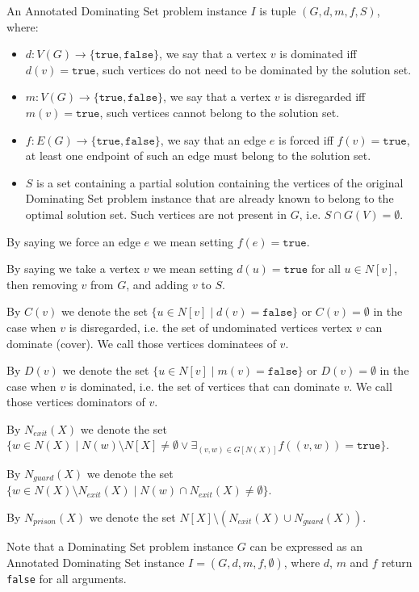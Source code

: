 \documentclass[a4paper,UKenglish,cleveref, autoref, thm-restate]{lipics-v2021}
\begin{document}
An Annotated Dominating Set problem instance $I$ is tuple $(G, d, m, f, S)$, where:
\begin{itemize}
    \item $d: V(G) \to \{\texttt{true}, \texttt{false}\}$, we say that a vertex $v$ is dominated iff $d(v) = \texttt{true}$, such vertices do not need to be dominated by the solution set.
    \item $m: V(G) \to \{\texttt{true}, \texttt{false}\}$, we say that a vertex $v$ is disregarded iff $m(v) = \texttt{true}$, such vertices cannot belong to the solution set.
    \item $f: E(G) \to \{\texttt{true}, \texttt{false}\}$, we say that an edge $e$ is forced iff $f(v) = \texttt{true}$, at least one endpoint of such an edge must belong to the solution set.
    \item $S$ is a set containing a partial solution containing the vertices of the original Dominating Set problem instance that are already known to belong to the optimal solution set.
    Such vertices are not present in $G$, i.e. $S \cap G(V) = \emptyset$.
\end{itemize}

By saying we force an edge $e$ we mean setting $f(e) = \texttt{true}$.

By saying we take a vertex $v$ we mean setting $d(u) = \texttt{true}$ for all $u \in N[v]$, then removing $v$ from $G$, and adding $v$ to $S$.

By $C(v)$ we denote the set $\{u \in N[v] \mid d(v) = \texttt{false}\}$ or $C(v) = \emptyset$ in the case when $v$ is disregarded, i.e. the set of undominated vertices vertex $v$ can dominate (cover). We call those vertices dominatees of $v$.

By $D(v)$ we denote the set $\{u \in N[v] \mid m(v) = \texttt{false}\}$ or $D(v) = \emptyset$ in the case when $v$ is dominated, i.e. the set of vertices that can dominate $v$. We call those vertices dominators of $v$.

By $N_{exit}(X)$ we denote the set $\{w \in N(X) \mid N(w) \setminus N[X] \neq \emptyset \vee \exists_{(v, w) \in G[N(X)]} f((v, w)) = \texttt{true}\}$.

By $N_{guard}(X)$ we denote the set $\{ w \in N(X) \setminus N_{exit}(X)\mid N(w) \cap N_{exit}(X) \neq \emptyset\}$.

By $N_{prison}(X)$ we denote the set $N[X] \setminus (N_{exit}(X) \cup N_{guard}(X))$.


Note that a Dominating Set problem instance $G$ can be expressed as an Annotated Dominating Set instance $I = (G, d, m, f, \emptyset)$, where $d$, $m$ and $f$ return \texttt{false} for all arguments.
\end{document}
